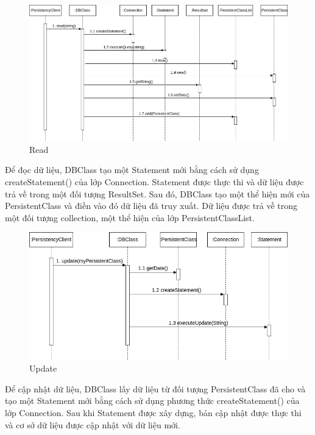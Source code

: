 \begin{figure}[H]
    \centering
    \includegraphics[width=\linewidth]{img3.1.2/design mechanism-Read.drawio.png}
    \caption{Read}
\end{figure}
Để đọc dữ liệu, DBClass tạo một Statement mới bằng cách sử dụng createStatement() của lớp Connection. Statement được thực thi và dữ liệu được trả về trong một đối tượng ResultSet. Sau đó, DBClass tạo một thể hiện mới của PersistentClass và điền vào đó dữ liệu đã truy xuất. Dữ liệu được trả về trong một đối tượng collection, một thể hiện của lớp PersistentClassList.

\begin{figure}[H]
    \centering
    \includegraphics[width=0.9\linewidth]{img3.1.2/design mechanism-Update.drawio.png}
    \caption{Update}
\end{figure}
Để cập nhật dữ liệu, DBClass lấy dữ liệu từ đối tượng PersistentClass đã cho và tạo một Statement mới bằng cách sử dụng phương thức createStatement() của lớp Connection. Sau khi Statement được xây dựng, bản cập nhật được thực thi và cơ sở dữ liệu được cập nhật với dữ liệu mới.

